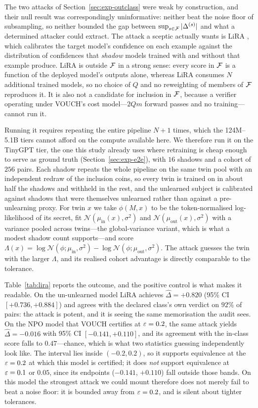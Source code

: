 The two attacks of Section~\ref{sec:exp-outclass} were weak by construction, and
their null result was correspondingly uninformative: neither beat the noise floor of
subsampling, so neither bounded the gap between $\sup_{s\in\mathcal{F}}|\Delta^{(s)}|$ and what
a determined attacker could extract. The attack a sceptic actually wants is
LiRA \citep{carlini2022lira}, which calibrates the target model's confidence on each
example against the distribution of confidences that \emph{shadow} models trained with
and without that example produce. LiRA is outside $\mathcal{F}$ in a strong sense: every score
in $\mathcal{F}$ is a function of the deployed model's outputs alone, whereas LiRA consumes
$N$ additional trained models, so no choice of $Q$ and no reweighting of members of
$\mathcal{F}$ reproduces it. It is also not a candidate for inclusion in $\mathcal{F}$, because a
verifier operating under VOUCH's cost model---$2Qm$ forward passes and no
training---cannot run it.

Running it requires repeating the entire pipeline $N+1$ times, which the 124M--5.1B
tiers cannot afford on the compute available here. We therefore run it on the
TinyGPT tier, the one this study already uses where retraining is cheap enough to
serve as ground truth (Section~\ref{sec:exp-e2e}), with $16$ shadows and a cohort of
$256$ pairs. Each shadow repeats the whole pipeline on the same twin pool with an
independent redraw of the inclusion coins, so every twin is trained on in about half
the shadows and withheld in the rest, and the unlearned subject is calibrated against
shadows that were themselves unlearned rather than against a pre-unlearning proxy.
For twin $x$ we take $\phi(M,x)$ to be the token-normalised log-likelihood of its
secret, fit $\mathcal{N}(\mu_{\mathrm{in}}(x),\sigma^2)$ and
$\mathcal{N}(\mu_{\mathrm{out}}(x),\sigma^2)$ with a variance pooled across twins---the
global-variance variant, which is what a modest shadow count supports---and score
$\Lambda(x) = \log \mathcal{N}(\phi; \mu_{\mathrm{in}}, \sigma^2)
- \log \mathcal{N}(\phi; \mu_{\mathrm{out}}, \sigma^2)$. The attack guesses the twin
with the larger $\Lambda$, and its realised cohort advantage is directly comparable to
the tolerance.

Table~\ref{tab:lira} reports the outcome, and the positive control is what makes it
readable. On the un-unlearned model LiRA achieves $\hat\Delta = +0.820$
(95\% CI $[+0.736, +0.884]$) and agrees with the declared class's own verdict on
$92\%$ of pairs: the attack is potent, and it is seeing the same memorisation the
audit sees. On the NPO model that VOUCH certifies at $\varepsilon = 0.2$, the same attack
yields $\hat\Delta = -0.016$ with 95\% CI $[-0.141, +0.110]$, and its agreement with
the in-class score falls to $0.47$---chance, which is what two statistics guessing
independently look like. The interval lies inside $(-0.2, 0.2)$, so it supports equivalence at the $\varepsilon=0.2$
at which this model is certified; it does \emph{not} support equivalence at $\varepsilon=0.1$
or $0.05$, since its endpoints ($-0.141$, $+0.110$) fall outside those bands. On this
model the strongest attack we could mount therefore does not merely fail to beat a
noise floor: it is bounded away from $\varepsilon=0.2$, and is silent about tighter
tolerances.

